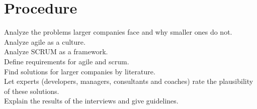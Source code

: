 % 
\section*{Procedure}

Analyze the problems larger companies face and why smaller ones do not.\\
Analyze agile as a culture.\\
Analyze SCRUM as a framework.\\
Define requirements for agile and scrum.\\
Find solutions for larger companies by literature.\\
Let experts (developers, managers, consultants and coaches) rate the plausibility of these solutions.\\
Explain the results of the interviews and give guidelines.